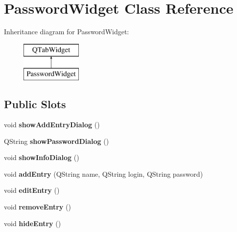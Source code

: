 \hypertarget{class_password_widget}{}\section{Password\+Widget Class Reference}
\label{class_password_widget}
Inheritance diagram for Password\+Widget\+:\begin{figure}[H]
\begin{center}
\leavevmode
\includegraphics[height=2.000000cm]{class_password_widget}
\end{center}
\end{figure}
\subsection*{Public Slots}
\begin{DoxyCompactItemize}
\item 
\mbox{\label{class_password_widget_a6e0dd464814c2556aff7c415f5f55822}} 
void {\bfseries show\+Add\+Entry\+Dialog} ()
\item 
\mbox{\label{class_password_widget_a885edb6aef55c0f830d2bcf9b3365fe1}} 
Q\+String {\bfseries show\+Password\+Dialog} ()
\item 
\mbox{\label{class_password_widget_ad4fecd3d9ca76d116b42ccfad7549aa0}} 
void {\bfseries show\+Info\+Dialog} ()
\item 
\mbox{\label{class_password_widget_a24cae4402b837bf682a4320f0371c000}} 
void {\bfseries add\+Entry} (Q\+String name, Q\+String login, Q\+String password)
\item 
\mbox{\label{class_password_widget_a8b7812b1d61087f4ea16e20f35637f4e}} 
void {\bfseries edit\+Entry} ()
\item 
\mbox{\label{class_password_widget_afefb75505d00dafbc2ba40f488b3ed41}} 
void {\bfseries remove\+Entry} ()
\item 
\mbox{\label{class_password_widget_af811fdec754b7cd4b36a4b1797e13a6e}} 
void {\bfseries hide\+Entry} ()
\end{DoxyCompactItemize}
